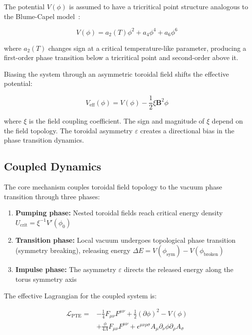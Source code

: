 \documentclass[12pt,a4paper]{article}
\begin{document}
The potential $V(\phi)$ is assumed to have a tricritical point structure analogous to the Blume-Capel model~\cite{blume2025}:

\begin{equation}
V(\phi) = a_2(T)\phi^2 + a_4\phi^4 + a_6\phi^6
\label{eq:potential}
\end{equation}

where $a_2(T)$ changes sign at a critical temperature-like parameter, producing a first-order phase transition below a tricritical point and second-order above it.

Biasing the system through an asymmetric toroidal field shifts the effective potential:

\begin{equation}
V_{\text{eff}}(\phi) = V(\phi) - \frac{1}{2}\xi \mathbf{B}^2\phi
\label{eq:biased}
\end{equation}

where $\xi$ is the field coupling coefficient. The sign and magnitude of $\xi$ depend on the field topology. The toroidal asymmetry $\varepsilon$ creates a directional bias in the phase transition dynamics.

\subsection{Coupled Dynamics}

The core mechanism couples toroidal field topology to the vacuum phase transition through three phases:

\begin{enumerate}
    \item \textbf{Pumping phase:} Nested toroidal fields reach critical energy density $U_{\text{crit}} = \xi^{-1} V'(\phi_0)$
    \item \textbf{Transition phase:} Local vacuum undergoes topological phase transition (symmetry breaking), releasing energy $\Delta E = V(\phi_{\text{sym}}) - V(\phi_{\text{broken}})$
    \item \textbf{Impulse phase:} The asymmetry $\varepsilon$ directs the released energy along the torus symmetry axis
\end{enumerate}

The effective Lagrangian for the coupled system is:

\begin{align}
\mathcal{L}_{\text{PTE}} = &-\frac{1}{4}F_{\mu\nu}F^{\mu\nu} + \frac{1}{2}(\partial\phi)^2 - V(\phi) \nonumber \\
&+ \frac{\phi}{4\Lambda}F_{\mu\nu}F^{\mu\nu} + \epsilon^{\mu\nu\rho\sigma}A_\mu\partial_\nu\phi\partial_\rho A_\sigma
\label{eq:lagrangian}
\end{align}
\end{document}
